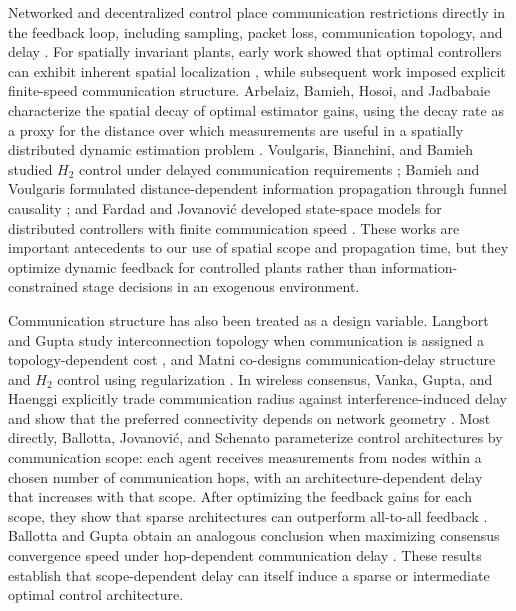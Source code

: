 \documentclass[11pt]{article}
\begin{document}
Networked and decentralized control place communication restrictions directly
in the feedback loop, including sampling, packet loss, communication topology,
and delay \cite{hespanha2007survey}. For spatially invariant plants, early work
showed that optimal controllers can exhibit inherent spatial localization
\cite{bamieh2002spatial}, while subsequent work imposed explicit finite-speed
communication structure. Arbelaiz, Bamieh, Hosoi, and Jadbabaie characterize
the spatial decay of optimal estimator gains, using the decay rate as a proxy
for the distance over which measurements are useful in a spatially distributed
dynamic estimation problem \cite{arbelaiz2025estimation}. Voulgaris, Bianchini, and Bamieh studied $H_2$ control
under delayed communication requirements \cite{voulgaris2003optimal}; Bamieh
and Voulgaris formulated distance-dependent information propagation through
funnel causality \cite{bamieh2005convex}; and Fardad and Jovanovi\'c developed
state-space models for distributed controllers with finite communication speed
\cite{fardad2011finite}. These works are important antecedents to our use of
spatial scope and propagation time, but they optimize dynamic feedback for
controlled plants rather than information-constrained stage decisions in an
exogenous environment.

Communication structure has also been treated as a design variable. Langbort
and Gupta study interconnection topology when communication is assigned a
topology-dependent cost \cite{langbort2009minimal}, and Matni co-designs
communication-delay structure and $H_2$ control using regularization
\cite{matni2017communication}. In wireless consensus, Vanka, Gupta, and Haenggi
explicitly trade communication radius against interference-induced delay
and show that the preferred connectivity depends on network geometry
\cite{vanka2010power}. Most directly, Ballotta, Jovanovi\'c, and Schenato
parameterize control architectures by communication scope: each agent receives
measurements from nodes within a chosen number of communication hops, with an
architecture-dependent delay that increases with that scope. After optimizing
the feedback gains for each scope, they show that sparse architectures can
outperform all-to-all feedback \cite{ballotta2023latency}. Ballotta and Gupta
obtain an analogous conclusion when maximizing consensus convergence speed
under hop-dependent communication delay \cite{ballotta2023sparser}. These
results establish that scope-dependent delay can itself induce a sparse or
intermediate optimal control architecture.
\end{document}
